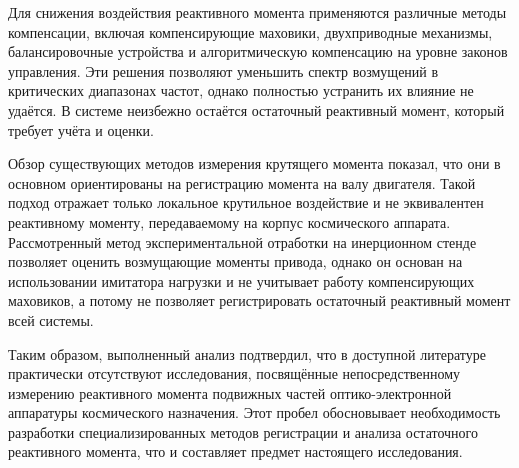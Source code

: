 Для снижения воздействия реактивного момента применяются различные методы компенсации, включая компенсирующие маховики, двухприводные механизмы, балансировочные устройства и алгоритмическую компенсацию на уровне законов управления. Эти решения позволяют уменьшить спектр возмущений в критических диапазонах частот, однако полностью устранить их влияние не удаётся. В системе неизбежно остаётся остаточный реактивный момент, который требует учёта и оценки.

Обзор существующих методов измерения крутящего момента показал, что они в основном ориентированы на регистрацию момента на валу двигателя. Такой подход отражает только локальное крутильное воздействие и не эквивалентен реактивному моменту, передаваемому на корпус космического аппарата. Рассмотренный метод экспериментальной отработки на инерционном стенде позволяет оценить возмущающие моменты привода, однако он основан на использовании имитатора нагрузки и не учитывает работу компенсирующих маховиков, а потому не позволяет регистрировать остаточный реактивный момент всей системы.

Таким образом, выполненный анализ подтвердил, что в доступной литературе практически отсутствуют исследования, посвящённые непосредственному измерению реактивного момента подвижных частей оптико-электронной аппаратуры космического назначения. Этот пробел обосновывает необходимость разработки специализированных методов регистрации и анализа остаточного реактивного момента, что и составляет предмет настоящего исследования.

\FloatBarrier

